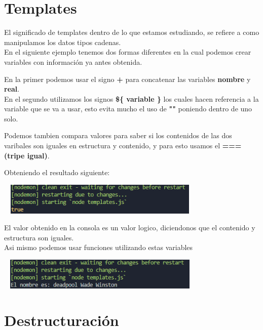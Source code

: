 \documentclass{report}
\begin{document}
\chapter{Templates}
El significado de templates dentro de lo que estamos estudiando, se refiere a como manipulamos los datos tipos cadenas.\\
En el siguiente ejemplo tenemos dos formas diferentes en la cual podemos crear variables con información ya antes obtenida.

En la primer podemos usar el signo \textbf{+} para concatenar las variables \textbf{nombre} y \textbf{real}.\\
En el segundo utilizamos los signos  \textbf{\$\{ variable \}} los cuales hacen referencia a la variable que se va a usar, esto evita mucho el uso de \textbf{""} poniendo dentro de uno solo.

Podemos tambien compara valores para saber si los contenidos de las dos varibales son iguales en estructura y contenido, y para esto usamos el \textbf{=== (tripe igual)}.

Obteniendo el resultado siguiente:
\begin{center}
  \includegraphics[width=10cm, height=1.5cm]{4.PNG}
\end{center}
El valor obtenido en la consola es un valor logico, diciendonos que el contenido y estructura son iguales.\\
Asi mismo podemos usar funciones utilizando estas variables

\begin{center}
  \includegraphics[width=10cm, height=1.5cm]{5.PNG}
\end{center}



\chapter{Destructuración}
\end{document}
